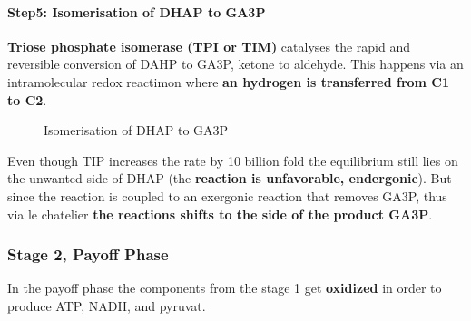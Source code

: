 \documentclass[../main.tex]{subfiles}
\begin{document}
\paragraph{Step5: Isomerisation of DHAP to GA3P}
\textbf{Triose phosphate isomerase (TPI or TIM)} catalyses the rapid and reversible conversion of DAHP to GA3P, ketone to aldehyde. This happens via an intramolecular redox reactimon where \textbf{an hydrogen is transferred from C1 to C2}.
\begin{figure}[H]
	\centering
	\caption{Isomerisation of DHAP to GA3P}
\end{figure}
Even though TIP increases the rate by 10 billion fold the equilibrium still lies on the unwanted side of DHAP (the \textbf{reaction is unfavorable, endergonic}). But since the reaction is coupled to an exergonic reaction that removes GA3P, thus via le chatelier \textbf{the reactions shifts to the side of the product GA3P}.  

\subsubsection{Stage 2, Payoff Phase}
In the payoff phase the components from the stage 1 get \textbf{oxidized} in order to produce ATP, NADH, and pyruvat. 
\end{document}
